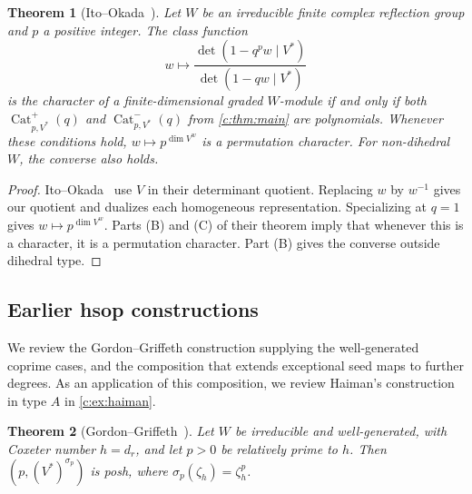 \documentclass[11pt]{amsart}
\DeclareMathOperator{\Cat}{Cat}
\newtheorem{theorem}{Theorem}[section]
\theoremstyle{definition}
\begin{document}
\begin{theorem}[Ito--Okada~{\cite[Theorem 1.4]{IO}}]\label{b:thm:IO}
Let $W$ be an irreducible finite complex reflection group and $p$ a
positive integer. The class function
\[
 w\longmapsto
 \frac{\det(1-q^p w\mid V^*)}{\det(1-qw\mid V^*)}
\]
is the character of a finite-dimensional graded $W$-module if and only
if both $\Cat^+_{p,V^*}(q)$ and $\Cat^-_{p,V^*}(q)$ from
\cref{c:thm:main} are polynomials. Whenever these conditions hold,
$w\mapsto p^{\dim V^w}$ is a permutation character. For non-dihedral
$W$, the converse also holds.
\end{theorem}
\begin{proof}
Ito--Okada~\cite[Theorem 1.4(A)]{IO} use $V$ in their determinant
quotient. Replacing $w$ by $w^{-1}$ gives our quotient and dualizes
each homogeneous representation. Specializing at $q=1$ gives
$w\mapsto p^{\dim V^w}$. Parts (B) and (C) of their theorem imply
that whenever this is a character, it is a permutation character.
Part (B) gives the converse outside dihedral type.
\end{proof}

\subsection{Earlier hsop constructions}\label{c:sec:cherednik}

We review the Gordon--Griffeth construction supplying the well-generated
coprime cases, and the composition that extends exceptional
seed maps to further degrees. As an application of this composition,
we review Haiman's construction in type $A$ in \cref{c:ex:haiman}.

\begin{theorem}[{Gordon--Griffeth~\cite[Theorem~2.11 and Section~2.18]{GG}}]
\label{c:thm:GG}
Let $W$ be irreducible and well-generated, with Coxeter number $h=d_r$,
and let $p>0$ be relatively prime to $h$. Then
$(p,(V^*)^{\sigma_p})$ is posh, where $\sigma_p(\zeta_h)=\zeta_h^p$.
\end{theorem}
\end{document}
